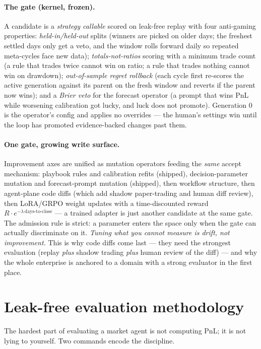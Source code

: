 \documentclass[10pt,twocolumn]{article}
\begin{document}
\paragraph{The gate (kernel, frozen).} A candidate is a \emph{strategy callable}
scored on leak-free replay with four anti-gaming properties:
\emph{held-in/held-out} splits (winners are picked on older days; the freshest
settled days only get a veto, and the window rolls forward daily so repeated
meta-cycles face new data); \emph{totals-not-ratios} scoring with a minimum trade
count (a rule that trades twice cannot win on ratio; a rule that trades nothing
cannot win on drawdown); \emph{out-of-sample regret rollback} (each cycle first
re-scores the active generation against its parent on the fresh window and
reverts if the parent now wins); and a \emph{Brier veto} for the forecast
operator (a prompt that wins PnL while worsening calibration got lucky, and luck
does not promote). Generation 0 is the operator's config and applies no
overrides --- the human's settings win until the loop has promoted
evidence-backed changes past them.

\paragraph{One gate, growing write surface.} Improvement axes are unified as
mutation operators feeding the \emph{same} accept mechanism: playbook rules and
calibration refits (shipped), decision-parameter mutation and forecast-prompt
mutation (shipped), then workflow structure, then agent-plane code diffs (which
add shadow paper-trading and human diff review), then LoRA/GRPO weight updates
with a time-discounted reward $R\cdot e^{-\lambda\,\text{days-to-close}}$ --- a
trained adapter is just another candidate at the same gate. The admission rule is
strict: a parameter enters the space only when the gate can actually discriminate
on it. \emph{Tuning what you cannot measure is drift, not improvement.} This is
why code diffs come last --- they need the strongest evaluation (replay \emph{plus}
shadow trading \emph{plus} human review of the diff) --- and why the whole
enterprise is anchored to a domain with a strong evaluator in the first place.

\section{Leak-free evaluation methodology}
\label{sec:eval}

The hardest part of evaluating a market agent is not computing PnL; it is not
lying to yourself. Two commands encode the discipline.
\end{document}
